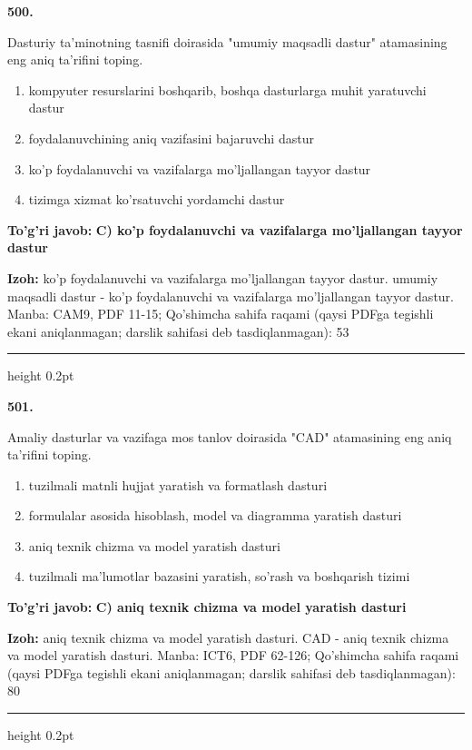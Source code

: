\documentclass[10pt,a4paper]{article}
\begin{document}
{\bfseries\sffamily\color{ink} 500.}
\par
Dasturiy ta'minotning tasnifi doirasida "umumiy maqsadli dastur" atamasining eng aniq ta'rifini toping.
\begin{enumerate}[label=\Alph*),leftmargin=9mm]
\item kompyuter resurslarini boshqarib, boshqa dasturlarga muhit yaratuvchi dastur
\item foydalanuvchining aniq vazifasini bajaruvchi dastur
\item ko'p foydalanuvchi va vazifalarga mo'ljallangan tayyor dastur
\item tizimga xizmat ko'rsatuvchi yordamchi dastur
\end{enumerate}
\begin{tcolorbox}[enhanced,breakable,colback=teal!4,colframe=teal!60!black,boxrule=0.45pt,arc=1.2mm,left=2.7mm,right=2.7mm,top=1.8mm,bottom=1.8mm,before skip=2mm,after skip=2mm]
{\bfseries\sffamily\color{teal}To'g'ri javob:} \textbf{C) ko'p foydalanuvchi va vazifalarga mo'ljallangan tayyor dastur}
\par\smallskip
{\bfseries Izoh:} ko'p foydalanuvchi va vazifalarga mo'ljallangan tayyor dastur. umumiy maqsadli dastur - ko'p foydalanuvchi va vazifalarga mo'ljallangan tayyor dastur. Manba: CAM9, PDF 11-15; Qo'shimcha sahifa raqami (qaysi PDFga tegishli ekani aniqlanmagan; darslik sahifasi deb tasdiqlanmagan): 53
\end{tcolorbox}
\vspace{2mm}\hrule height 0.2pt\vspace{3mm}

{\bfseries\sffamily\color{ink} 501.}
\par
Amaliy dasturlar va vazifaga mos tanlov doirasida "CAD" atamasining eng aniq ta'rifini toping.
\begin{enumerate}[label=\Alph*),leftmargin=9mm]
\item tuzilmali matnli hujjat yaratish va formatlash dasturi
\item formulalar asosida hisoblash, model va diagramma yaratish dasturi
\item aniq texnik chizma va model yaratish dasturi
\item tuzilmali ma'lumotlar bazasini yaratish, so'rash va boshqarish tizimi
\end{enumerate}
\begin{tcolorbox}[enhanced,breakable,colback=teal!4,colframe=teal!60!black,boxrule=0.45pt,arc=1.2mm,left=2.7mm,right=2.7mm,top=1.8mm,bottom=1.8mm,before skip=2mm,after skip=2mm]
{\bfseries\sffamily\color{teal}To'g'ri javob:} \textbf{C) aniq texnik chizma va model yaratish dasturi}
\par\smallskip
{\bfseries Izoh:} aniq texnik chizma va model yaratish dasturi. CAD - aniq texnik chizma va model yaratish dasturi. Manba: ICT6, PDF 62-126; Qo'shimcha sahifa raqami (qaysi PDFga tegishli ekani aniqlanmagan; darslik sahifasi deb tasdiqlanmagan): 80
\end{tcolorbox}
\vspace{2mm}\hrule height 0.2pt\vspace{3mm}
\end{document}
